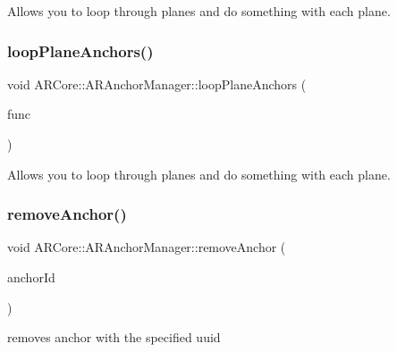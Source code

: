 Allows you to loop through planes and do something with each plane. 

\mbox{\label{class_a_r_core_1_1_a_r_anchor_manager_a6f3215e085a92b1165b3da58138adbfc}} 
\subsubsection{\texorpdfstring{loop\+Plane\+Anchors()}{loopPlaneAnchors()}\hspace{0.1cm}{\footnotesize\ttfamily [2/2]}}
{\footnotesize\ttfamily void A\+R\+Core\+::\+A\+R\+Anchor\+Manager\+::loop\+Plane\+Anchors (\begin{DoxyParamCaption}\item[{std\+::function$<$ void(\hyperlink{struct_a_r_objects_1_1_plane_anchor_object}{Plane\+Anchor\+Object}, int index)$>$}]{func }\end{DoxyParamCaption})}



Allows you to loop through planes and do something with each plane. 

\mbox{\label{class_a_r_core_1_1_a_r_anchor_manager_a28ed88e530bc1991e59f26e6b580d5c5}} 
\subsubsection{\texorpdfstring{remove\+Anchor()}{removeAnchor()}\hspace{0.1cm}{\footnotesize\ttfamily [1/2]}}
{\footnotesize\ttfamily void A\+R\+Core\+::\+A\+R\+Anchor\+Manager\+::remove\+Anchor (\begin{DoxyParamCaption}\item[{N\+S\+U\+U\+ID $\ast$}]{anchor\+Id }\end{DoxyParamCaption})}



removes anchor with the specified uuid 

